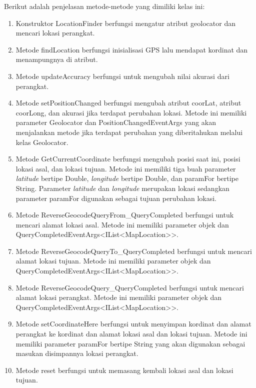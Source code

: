 Berikut adalah penjelasan metode-metode yang dimiliki kelas ini:
\begin{enumerate}
	\item Konstruktor LocationFinder berfungsi mengatur atribut geolocator dan mencari lokasi perangkat.
	\item Metode findLocation berfungsi inisialisasi GPS lalu mendapat kordinat dan menampungnya di atribut.
	\item Metode updateAccuracy berfungsi untuk mengubah nilai akurasi dari perangkat.
	\item Metode setPositionChanged berfungsi mengubah atribut coorLat, atribut coorLong, dan akurasi jika terdapat perubahan lokasi. Metode ini memiliki parameter Geolocator dan PositionChangedEventArgs yang akan menjalankan metode jika terdapat perubahan yang diberitahukan melalui kelas Geolocator.
	\item Metode GetCurrentCoordinate berfungsi mengubah posisi saat ini, posisi lokasi asal, dan lokasi tujuan. Metode ini memiliki tiga buah parameter \textit{latitude} bertipe Double, \textit{longitude} bertipe Double, dan paramFor bertipe String. Parameter \textit{latitude} dan \textit{longitude} merupakan lokasi sedangkan parameter paramFor digunakan sebagai tujuan perubahan lokasi. 
	\item Metode ReverseGeocodeQueryFrom\_QueryCompleted berfungsi untuk mencari alamat lokasi asal. Metode ini memiliki parameter objek dan QueryCompletedEventArgs<IList<MapLocation>>.
	\item Metode ReverseGeocodeQueryTo\_QueryCompleted berfungsi untuk mencari alamat lokasi tujuan. Metode ini memiliki parameter objek dan QueryCompletedEventArgs<IList<MapLocation>>.
	\item Metode ReverseGeocodeQuery\_QueryCompleted berfungsi untuk mencari alamat lokasi perangkat. Metode ini memiliki parameter objek dan QueryCompletedEventArgs<IList<MapLocation>>.
	\item Metode setCoordinateHere berfungsi untuk menyimpan kordinat dan alamat perangkat ke kordinat dan alamat lokasi asal dan lokasi tujuan. Metode ini memiliki parameter paramFor bertipe String yang akan digunakan sebagai masukan disimpannya lokasi perangkat.
	\item Metode reset berfungsi untuk memasang kembali lokasi asal dan lokasi tujuan.
\end{enumerate}

